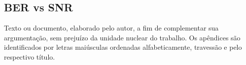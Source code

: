 \begin{apendicesenv}
\chapter{BER vs SNR}

Texto ou documento, elaborado pelo autor, a fim de complementar sua argumentação, sem prejuízo da unidade nuclear do trabalho. Os apêndices são identificados por letras maiúsculas ordenadas alfabeticamente, travessão e pelo respectivo título. 

\end{apendicesenv}
